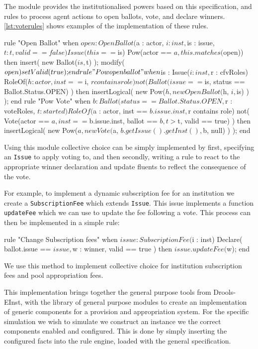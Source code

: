 The module provides the institutionalised powers based on this specification,
and rules to process agent actions to open ballots, vote, and declare winners.
\autoref{lst:voterules} shows examples of the implementation of these rules.

\begin{drools}[label=lst:voterules,caption={Opening of ballots and voting.}]
rule "Open Ballot"
	when
		$open : OpenBallot($a : actor, $i : inst, $is : issue, $t: t, valid == false)
		Issue(this == $is)
		Pow(actor == $a, this.matches($open))
	then
		insert( new Ballot($is, $t) );
		modify($open) {
			setValid(true);
		}
end
rule "Pow open ballot"
	when
		$is : Issue($i : inst, $r : cfvRoles)
		RoleOf($h : actor, inst == $i, $r contains role)
		not( Ballot(issue == $is, status == Ballot.Status.OPEN) )
	then
		insertLogical( new Pow($h, new OpenBallot($h, $i, $is) ) );
end
rule "Pow Vote"
	when
		$b : Ballot(status == Ballot.Status.OPEN, $r : voteRoles, $t : started)
		RoleOf($a : actor, inst == $b.issue.inst, $r contains role)
		not( Vote(actor == $a, inst == $b.issue.inst, ballot == $b, t > $t, valid == true) )
	then
		insertLogical( new Pow($a, new Vote($a, $b.getIssue().getInst(), $b, null) ) );
end
\end{drools}

Using this module collective choice can be simply implemented by first,
specifying an \texttt{Issue} to apply voting to, and then secondly, writing a
rule to react to the appropriate winner declaration and update fluents to
reflect the consequence of the vote.

For example, to implement a dynamic subscription fee for an institution we
create a \texttt{SubscriptionFee} which extends \texttt{Issue}. This issue
implements a function \texttt{updateFee} which we can use to update the fee
following a vote. This process can then be implemented in a simple rule:

\begin{droolsinline}
rule "Change Subscription fees"
	when
		$issue : SubscriptionFee($i : inst)
		Declare( ballot.issue == $issue, $w : winner, valid == true )
	then
		$issue.updateFee($w);
end
\end{droolsinline}

We use this method to implement collective choice for institution subscription
fees and pool appropriation fees.


This implementation brings together the general purpose tools from Drools-
EInst, with the library of general purpose modules to create an implementation
of generic components for a provision and appropriation system. For the
specific simulation we wish to simulate we construct an instance we the
correct components enabled and configured. This is done by simply inserting
the configured facts into the rule engine, loaded with the general
specification.

